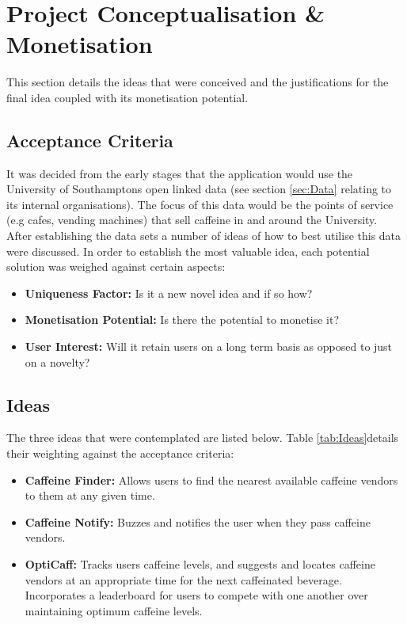 \section{Project Conceptualisation \& Monetisation}

This section details the ideas that were conceived and the justifications for the final idea coupled with its monetisation potential. 

\subsection{Acceptance Criteria}
It was decided from the early stages that the application would use the University of Southamptons open linked data (see section \ref{sec:Data} relating to its internal organisations). 
The focus of this data would be the points of service (e.g cafes, vending machines) that sell caffeine in and around the University. 
After establishing the data sets a number of ideas of how to best utilise this data were discussed. 
In order to establish the most valuable idea, each potential solution was weighed against certain aspects: 

\begin{itemize}
	\item{\textbf{Uniqueness Factor:} Is it a new novel idea and if so how?}
	\item{\textbf{Monetisation Potential:} Is there the potential to monetise it?}
	\item{\textbf{User Interest:} Will it retain users on a long term basis as opposed to just on a novelty?}
\end{itemize}

\subsection{Ideas}
The three ideas that were contemplated are listed below. Table \ref{tab:Ideas}details their weighting against the acceptance criteria:

\begin{itemize}
	\item{\textbf{Caffeine Finder:} Allows users to find the nearest available caffeine vendors to them at any given time.}
	\item{\textbf{Caffeine Notify:} Buzzes and notifies the user when they pass caffeine vendors.}
	\item{\textbf{OptiCaff:} Tracks users caffeine levels, and suggests and locates caffeine vendors at an appropriate time for the next caffeinated beverage. Incorporates a leaderboard for users to compete with one another over maintaining optimum caffeine levels.}
\end{itemize}

